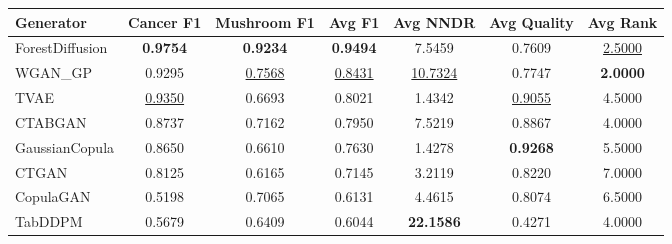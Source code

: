 \begin{tabular}{lcccccc}
\toprule
Generator & Cancer F1 & Mushroom F1 & Avg F1 & Avg NNDR & Avg Quality & Avg Rank \\
\midrule
ForestDiffusion & \textbf{0.9754} & \textbf{0.9234} & \textbf{0.9494} & 7.5459 & 0.7609 & \underline{2.5000} \\
WGAN_GP & 0.9295 & \underline{0.7568} & \underline{0.8431} & \underline{10.7324} & 0.7747 & \textbf{2.0000} \\
TVAE & \underline{0.9350} & 0.6693 & 0.8021 & 1.4342 & \underline{0.9055} & 4.5000 \\
CTABGAN & 0.8737 & 0.7162 & 0.7950 & 7.5219 & 0.8867 & 4.0000 \\
GaussianCopula & 0.8650 & 0.6610 & 0.7630 & 1.4278 & \textbf{0.9268} & 5.5000 \\
CTGAN & 0.8125 & 0.6165 & 0.7145 & 3.2119 & 0.8220 & 7.0000 \\
CopulaGAN & 0.5198 & 0.7065 & 0.6131 & 4.4615 & 0.8074 & 6.5000 \\
TabDDPM & 0.5679 & 0.6409 & 0.6044 & \textbf{22.1586} & 0.4271 & 4.0000 \\
\bottomrule
\end{tabular}
